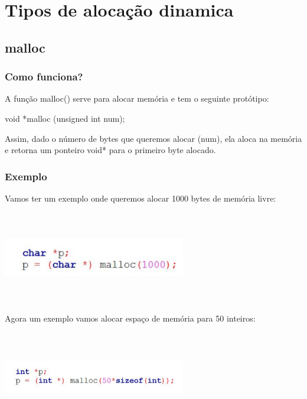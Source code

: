 \documentclass{report}
\begin{document}
	
	\section{Tipos de alocação dinamica}
	
	\subsection{malloc}
	
	\subsubsection{Como funciona?}
	
	A função malloc() serve para alocar memória e tem o seguinte protótipo:
	
	\begin{center}
		\begin{LARGE}
			void *malloc (unsigned int num);
		\end{LARGE}
	\end{center}
	
	Assim, dado o número de bytes que queremos alocar (num), ela aloca na memória e retorna um ponteiro void* para o primeiro byte alocado.
	
	\subsubsection{Exemplo}
	
	Vamos ter um exemplo onde queremos alocar 1000 bytes de memória livre:
	
	\begin{center}
		
		\includegraphics[width=8cm,height=4cm,keepaspectratio=false]{imagens/dynamicaloc2.png}
		
	\end{center}
	
	
	Agora um exemplo vamos alocar espaço de memória para 50 inteiros:
	
	
	\begin{center}
		
		\includegraphics[width=8cm,height=4cm,keepaspectratio=false]{imagens/dynamicaloc3.png}
		
	\end{center}
	
\end{document}
